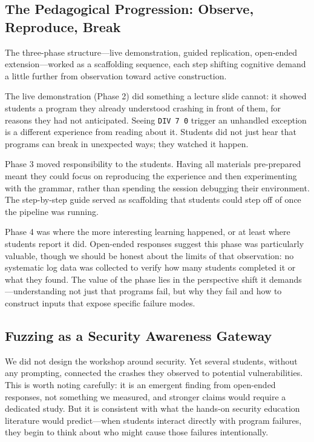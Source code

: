\documentclass[conference]{IEEEtran}
\begin{document}
\subsection{The Pedagogical Progression: Observe, Reproduce, Break}

The three-phase structure---live demonstration, guided replication, open-ended extension---worked as a scaffolding sequence, each step shifting cognitive demand a little further from observation toward active construction.

The live demonstration (Phase 2) did something a lecture slide cannot: it showed students a program they already understood crashing in front of them, for reasons they had not anticipated.
Seeing \texttt{DIV 7 0} trigger an unhandled exception is a different experience from reading about it.
Students did not just hear that programs can break in unexpected ways; they watched it happen.

Phase 3 moved responsibility to the students.
Having all materials pre-prepared meant they could focus on reproducing the experience and then experimenting with the grammar, rather than spending the session debugging their environment.
The step-by-step guide served as scaffolding that students could step off of once the pipeline was running.

Phase 4 was where the more interesting learning happened, or at least where students report it did.
Open-ended responses suggest this phase was particularly valuable, though we should be honest about the limits of that observation: no systematic log data was collected to verify how many students completed it or what they found.
The value of the phase lies in the perspective shift it demands---understanding not just that programs fail, but why they fail and how to construct inputs that expose specific failure modes.

\subsection{Fuzzing as a Security Awareness Gateway}

We did not design the workshop around security.
Yet several students, without any prompting, connected the crashes they observed to potential vulnerabilities.
This is worth noting carefully: it is an emergent finding from open-ended responses, not something we measured, and stronger claims would require a dedicated study.
But it is consistent with what the hands-on security education literature would predict---when students interact directly with program failures, they begin to think about who might cause those failures intentionally.
\end{document}
